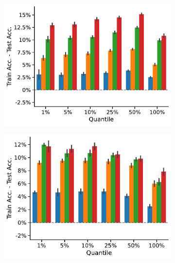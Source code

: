 \begin{figure}[!htb]
\begin{subfigure}[b]{0.3\textwidth}
		\vspace*{-4ex} 
		\caption{\imdb}
	\end{subfigure}
	\hfill
	\begin{subfigure}[b]{0.3\textwidth}
		\centering
		\includegraphics[width=\textwidth]{Figures/train_test_diff_k_wl_MUTAG.pdf}
		\vspace*{-4ex} 
		\caption{\mutag}
	\end{subfigure}
	\par\bigskip
	\begin{subfigure}[b]{0.3\textwidth}
		\centering
		\includegraphics[width=\textwidth]{Figures/train_test_diff_k_wl_NCI1.pdf}
		\vspace*{-4ex} 
		\caption{\nci}
	\end{subfigure}

\end{figure}
